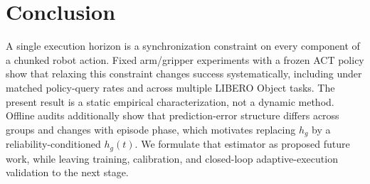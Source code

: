 \section{Conclusion}
\label{sec:conclusion}

A single execution horizon is a synchronization constraint on every component
of a chunked robot action.  Fixed arm/gripper experiments with a frozen ACT
policy show that relaxing this constraint changes success systematically,
including under matched policy-query rates and across multiple LIBERO Object
tasks.  The present result is a static empirical characterization, not a dynamic
method.  Offline audits additionally show that prediction-error structure differs
across groups and changes with episode phase, which motivates replacing $h_g$ by
a reliability-conditioned $h_g(t)$.  We formulate that estimator as proposed
future work, while leaving training, calibration, and closed-loop
adaptive-execution validation to the next stage.
